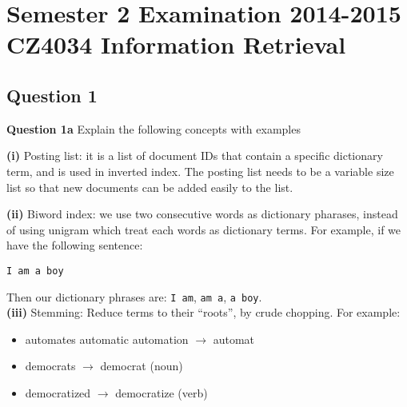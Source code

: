\documentclass[11pt,a4paper]{report}
\begin{document}
\chapter{Semester 2 Examination 2014-2015\\CZ4034 Information Retrieval}

\begin{multicols*}{2}

\section{Question 1}
\noindent \textbf{Question 1a} Explain the following concepts with examples

\noindent \textbf{(i)} Posting list: it is a list of document IDs that contain a specific dictionary term, and is used in inverted index. The posting list needs to be a variable size list so that new documents can be added easily to the list. 

\begin{center}
\end{center}

\noindent \textbf{(ii)} Biword index: we use two consecutive words as dictionary pharases, instead of using unigram which treat each words as dictionary terms. For example, if we have the following sentence:
\begin{center}
\verb|I am a boy|
\end{center}
\noindent Then our dictionary phrases are: \verb|I am|, \verb|am a|, \verb|a boy|. \\

\noindent \textbf{(iii)} Stemming: Reduce terms to their “roots”, by crude chopping. For example:
\begin{itemize}
    \item automates automatic automation $\rightarrow$ automat
    \item democrats $\rightarrow$ democrat (noun)
    \item democratized $\rightarrow$ democratize (verb)
\end{itemize} 


\end{multicols*}
\end{document}
